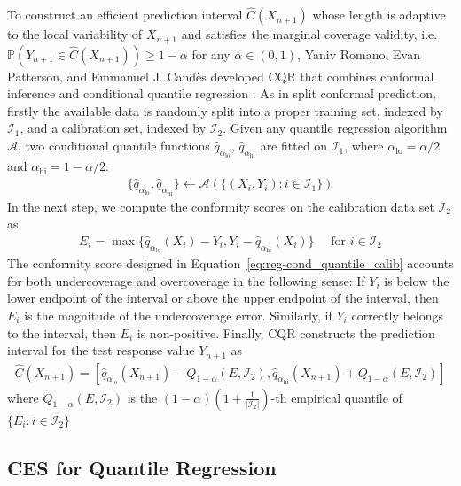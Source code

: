 To construct an efficient prediction interval $\hat{C}(X_{n+1})$ whose length is adaptive to the local variability of $X_{n+1}$ and satisfies the marginal coverage validity, i.e. $\mathbb{P}(Y_{n+1} \in \hat{C}(X_{n+1})) \geq 1-\alpha$ for any $\alpha \in (0,1)$, Yaniv Romano, Evan Patterson, and Emmanuel J. Candès developed CQR that combines conformal inference \cite{vovk1999machine} \cite{vovk2005algorithmic} and conditional quantile regression \cite{koenker1978quantreg}. As in split conformal prediction, firstly the available data is  randomly split into a proper training set, indexed by $\mathcal{I}_1$, and a calibration set, indexed by $\mathcal{I}_2$. Given any quantile regression algorithm $\mathcal{A}$, two conditional quantile functions $\hat{q}_{\alpha_{\text{lo}}}$, $\hat{q}_{\alpha_{\text{hi}}}$ are fitted on $\mathcal{I}_1$, where $\alpha_{\text{lo}} = \alpha/2$ and $\alpha_{\text{hi}} = 1-\alpha/2$: 
\begin{align} \label{eq:reg-cond_quantile_fit}
    \{ \hat{q}_{\alpha_{\text{lo}}}, \hat{q}_{\alpha_{\text{hi}}} \} \leftarrow \mathcal{A}(\{ (X_i, Y_i): i \in \mathcal{I}_1 \})
\end{align}
In the next step, we compute the conformity scores on the calibration data set $\mathcal{I}_2$ as 
\begin{align} \label{eq:reg-cond_quantile_calib}
    E_i = \max \{ \hat{q}_{\alpha_{\text{lo}}}(X_i) - Y_i, Y_i - \hat{q}_{\alpha_{\text{hi}}}(X_i) \} \quad \text{ for } i \in \mathcal{I}_2
\end{align}
The conformity score designed in Equation~\ref{eq:reg-cond_quantile_calib} accounts for both undercoverage and overcoverage in the following sense: If $Y_i$ is below the lower endpoint of the interval or above the upper endpoint of the interval, then $E_i$ is the magnitude of the undercoverage error. Similarly, if $Y_i$ correctly belongs to the interval, then $E_i$ is non-positive. 
Finally, CQR constructs the prediction interval for the test response value $Y_{n+1}$ as
\begin{align} \label{eq:reg-cond_quantile_construct_pi}
    \hat{C}(X_{n+1}) = [ \hat{q}_{\alpha_{\text{lo}}}(X_{n+1}) - Q_{1-\alpha}(E, \mathcal{I}_2), \hat{q}_{\alpha_{\text{hi}}}(X_{n+1}) + Q_{1-\alpha}(E, \mathcal{I}_2)
    ]
\end{align}
where $Q_{1-\alpha}(E, \mathcal{I}_2)$ is the $(1-\alpha)(1+\frac{1}{|\mathcal{I}_2|})$-th empirical quantile of $\{E_i: i\in \mathcal{I}_2\}$


\subsection{CES for Quantile Regression}

